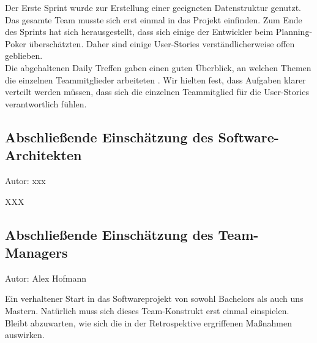 Der Erste Sprint wurde zur Erstellung einer geeigneten Datenstruktur genutzt. Das gesamte Team musste sich erst einmal in das Projekt einfinden. Zum Ende des Sprints hat sich herausgestellt, dass sich einige der Entwickler beim Planning-Poker überschätzten. Daher sind einige User-Stories verständlicherweise offen geblieben. \\
Die abgehaltenen Daily Treffen gaben einen guten Überblick, an welchen Themen die einzelnen Teammitglieder arbeiteten . Wir hielten fest, dass Aufgaben klarer verteilt werden müssen, dass sich die einzelnen Teammitglied für die User-Stories verantwortlich fühlen.  

\subsection{Abschließende Einschätzung des Software-Architekten}
{\small Autor: xxx}

XXX

\subsection{Abschließende Einschätzung des Team-Managers}
{\small Autor: Alex Hofmann}

Ein verhaltener Start in das Softwareprojekt von sowohl Bachelors als auch uns Mastern.
Natürlich muss sich dieses Team-Konstrukt erst einmal einspielen. Bleibt abzuwarten, wie sich die in der Retrospektive ergriffenen Maßnahmen auswirken.
